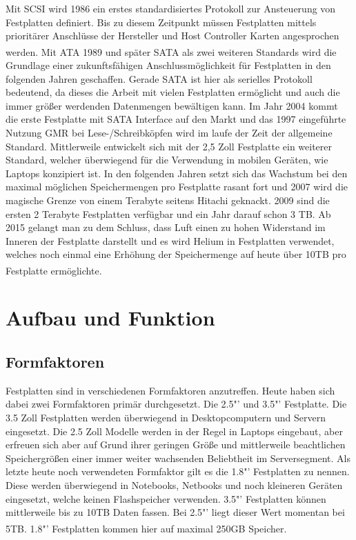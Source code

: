 \documentclass[a4paper, DIV20, 12pt, headsepline, parskip, flushleft]{scrartcl}
\begin{document}
Mit SCSI wird 1986 ein erstes standardisiertes Protokoll zur Ansteuerung von Festplatten definiert. Bis zu diesem Zeitpunkt müssen Festplatten mittels prioritärer Anschlüsse der Hersteller und Host Controller Karten angesprochen werden. \textsuperscript{\cite{hdd}}\newline
Mit ATA 1989 und später SATA als zwei weiteren Standards wird die Grundlage einer zukunftsfähigen Anschlussmöglichkeit für Festplatten in den folgenden Jahren geschaffen. Gerade SATA ist hier als serielles Protokoll bedeutend, da dieses die Arbeit mit vielen Festplatten ermöglicht und auch die immer größer werdenden Datenmengen bewältigen kann. Im Jahr 2004 kommt die erste Festplatte mit SATA Interface auf den Markt und das 1997 eingeführte Nutzung GMR bei Lese-/Schreibköpfen wird im laufe der Zeit der allgemeine Standard. Mittlerweile entwickelt sich mit der 2,5 Zoll Festplatte ein weiterer Standard, welcher überwiegend für die Verwendung in mobilen Geräten, wie Laptops konzipiert ist. \newline
In den folgenden Jahren setzt sich das Wachstum bei den maximal möglichen Speichermengen pro Festplatte rasant fort und 2007 wird die magische Grenze von einem Terabyte seitens Hitachi geknackt. 2009 sind die ersten 2 Terabyte Festplatten verfügbar und ein Jahr darauf schon 3 TB.\newline
Ab 2015 gelangt man zu dem Schluss, dass Luft einen zu hohen Widerstand im Inneren der Festplatte darstellt und es wird Helium in Festplatten verwendet, welches noch einmal eine Erhöhung der Speichermenge auf heute über 10TB pro Festplatte ermöglichte.\textsuperscript{\cite{hgsthel}}

\section{Aufbau und Funktion}

\subsection{Formfaktoren}
Festplatten sind in verschiedenen Formfaktoren anzutreffen. Heute haben sich dabei zwei Formfaktoren primär durchgesetzt. Die 2.5"' und 3.5"' Festplatte. Die 3.5 Zoll Festplatten werden überwiegend in Desktopcomputern und Servern eingesetzt. Die 2.5 Zoll Modelle werden in der Regel in Laptops eingebaut, aber erfreuen sich aber auf Grund ihrer geringen Größe und mittlerweile beachtlichen Speichergrößen  einer immer weiter wachsenden Beliebtheit im Serversegment. Als letzte heute noch verwendeten Formfaktor gilt es die 1.8"' Festplatten zu nennen. Diese werden überwiegend in Notebooks, Netbooks und noch kleineren Geräten eingesetzt, welche keinen Flashspeicher verwenden.
3.5"' Festplatten können mittlerweile bis zu 10TB Daten fassen. Bei 2.5"' liegt dieser Wert momentan bei 5TB. 
1.8"' Festplatten kommen hier auf maximal 250GB Speicher.
\textsuperscript{\cite{gza}\cite{gzb}\cite{gzc}}
\end{document}
